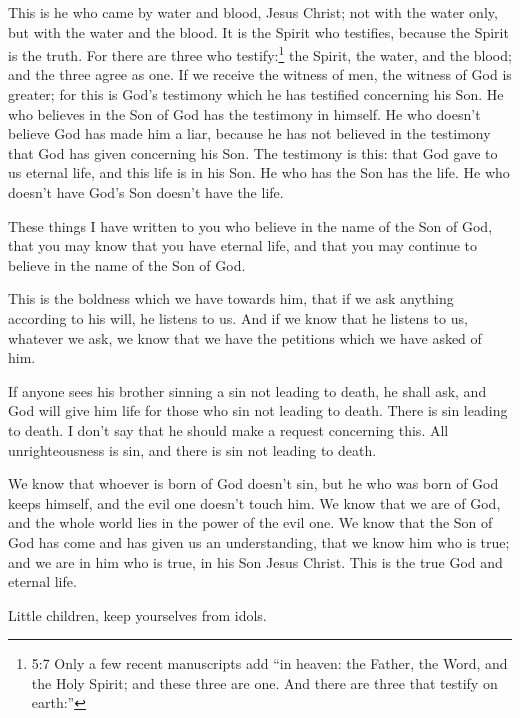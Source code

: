  This is he who came by water and blood, Jesus Christ; not
with the water only, but with the water and the blood. It is the Spirit
who testifies, because the Spirit is the truth.  For there
are three who testify:\footnote{5:7 Only a few recent manuscripts add
  ``in heaven: the Father, the Word, and the Holy Spirit; and these
  three are one. And there are three that testify on earth:''}
 the Spirit, the water, and the blood; and the three agree
as one.  If we receive the witness of men, the witness of
God is greater; for this is God's testimony which he has testified
concerning his Son.  He who believes in the Son of God has
the testimony in himself. He who doesn't believe God has made him a
liar, because he has not believed in the testimony that God has given
concerning his Son.  The testimony is this: that God gave
to us eternal life, and this life is in his Son.  He who
has the Son has the life. He who doesn't have God's Son doesn't have the
life.

 These things I have written to you who believe in the name
of the Son of God, that you may know that you have eternal life, and
that you may continue to believe in the name of the Son of God.

 This is the boldness which we have towards him, that if we
ask anything according to his will, he listens to us.  And
if we know that he listens to us, whatever we ask, we know that we have
the petitions which we have asked of him.

 If anyone sees his brother sinning a sin not leading to
death, he shall ask, and God will give him life for those who sin not
leading to death. There is sin leading to death. I don't say that he
should make a request concerning this.  All unrighteousness
is sin, and there is sin not leading to death.

 We know that whoever is born of God doesn't sin, but he
who was born of God keeps himself, and the evil one doesn't touch him.
 We know that we are of God, and the whole world lies in
the power of the evil one.  We know that the Son of God has
come and has given us an understanding, that we know him who is true;
and we are in him who is true, in his Son Jesus Christ. This is the true
God and eternal life.

 Little children, keep yourselves from idols.
